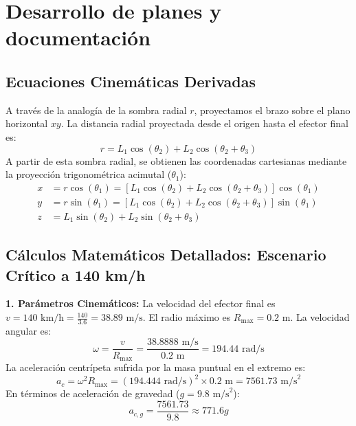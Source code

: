 \documentclass[11pt,a4paper]{article}
\begin{document}
\section{Desarrollo de planes y documentación}

\subsection{Ecuaciones Cinemáticas Derivadas}
A través de la analogía de la sombra radial $r$, proyectamos el brazo sobre el plano horizontal $xy$. La distancia radial proyectada desde el origen hasta el efector final es:
\begin{equation}
    r = L_1\cos(\theta_2) + L_2\cos(\theta_2 + \theta_3)
\end{equation}
A partir de esta sombra radial, se obtienen las coordenadas cartesianas mediante la proyección trigonométrica acimutal ($\theta_1$):
\begin{align}
    x &= r\cos(\theta_1) = \left[ L_1\cos(\theta_2) + L_2\cos(\theta_2 + \theta_3) \right]\cos(\theta_1) \\
    y &= r\sin(\theta_1) = \left[ L_1\cos(\theta_2) + L_2\cos(\theta_2 + \theta_3) \right]\sin(\theta_1) \\
    z &= L_1\sin(\theta_2) + L_2\sin(\theta_2 + \theta_3)
\end{align}

\subsection{Cálculos Matemáticos Detallados: Escenario Crítico a 140 km/h}
\textbf{1. Parámetros Cinemáticos:}
La velocidad del efector final es $v = 140\text{ km/h} = \frac{140}{3.6} = 38.89\text{ m/s}$. El radio máximo es $R_{\text{max}} = 0.2\text{ m}$. La velocidad angular es:
\begin{equation}
    \omega = \frac{v}{R_{\text{max}}} = \frac{38.8888\text{ m/s}}{0.2\text{ m}} = 194.44\text{ rad/s}
\end{equation}
La aceleración centrípeta sufrida por la masa puntual en el extremo es:
\begin{equation}
    a_c = \omega^2 R_{\text{max}} = (194.444\text{ rad/s})^2 \times 0.2\text{ m} = 7561.73\text{ m/s}^2
\end{equation}
En términos de aceleración de gravedad ($g = 9.8\text{ m/s}^2$):
\begin{equation}
    a_{c,g} = \frac{7561.73}{9.8} \approx 771.6g
\end{equation}
\end{document}
